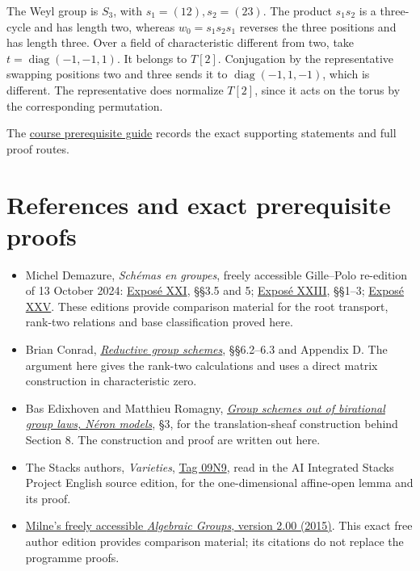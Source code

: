\documentclass[11pt,a4paper,openany]{report}
\providecommand{\tightlist}{\setlength{\itemsep}{0pt}\setlength{\parskip}{0pt}}
\begin{document}
The Weyl group is \(S_3\), with \(s_1=(12),s_2=(23)\). The product \(s_1s_2\) is a three-cycle and has length two, whereas \(w_0=s_1s_2s_1\) reverses the three positions and has length three. Over a field of characteristic different from two, take \(t=\operatorname{diag}(-1,-1,1)\). It belongs to \(T[2]\). Conjugation by the representative swapping positions two and three sends it to \(\operatorname{diag}(-1,1,-1)\), which is different. The representative does normalize \(T[2]\), since it acts on the torus by the corresponding permutation.

The \href{prerequisites.html}{course prerequisite guide} records the exact supporting statements and full proof routes.

\section{References and exact prerequisite proofs}\label{AG-RG-05-references-and-exact-prerequisite-proofs}

\begin{itemize}
\tightlist
\item
  Michel Demazure, \emph{Schémas en groupes}, freely accessible Gille--Polo re-edition of 13 October 2024: \href{https://webusers.imj-prg.fr/~patrick.polo/SGA3/Exp21-13oct24.pdf}{Exposé XXI}, §§3.5 and 5; \href{https://webusers.imj-prg.fr/~patrick.polo/SGA3/Exp23-13oct24.pdf}{Exposé XXIII}, §§1--3; \href{https://webusers.imj-prg.fr/~patrick.polo/SGA3/Exp25-13oct24.pdf}{Exposé XXV}. These editions provide comparison material for the root transport, rank-two relations and base classification proved here.
\item
  Brian Conrad, \href{https://math.stanford.edu/~conrad/papers/luminysga3.pdf}{\emph{Reductive group schemes}}, §§6.2--6.3 and Appendix D. The argument here gives the rank-two calculations and uses a direct matrix construction in characteristic zero.
\item
  Bas Edixhoven and Matthieu Romagny, \href{https://imag.umontpellier.fr/~romagny/articles/artin_birational_law.pdf}{\emph{Group schemes out of birational group laws, Néron models}}, §3, for the translation-sheaf construction behind Section 8. The construction and proof are written out here.
\item
  The Stacks authors, \emph{Varieties}, \href{https://stacks.math.columbia.edu/tag/09N9}{Tag 09N9}, read in the AI Integrated Stacks Project English source edition, for the one-dimensional affine-open lemma and its proof.
\item
  \href{https://www.jmilne.org/math/CourseNotes/iAG200.pdf}{Milne's freely accessible \emph{Algebraic Groups}, version 2.00 (2015)}. This exact free author edition provides comparison material; its citations do not replace the programme proofs.
\end{itemize}
\end{document}
